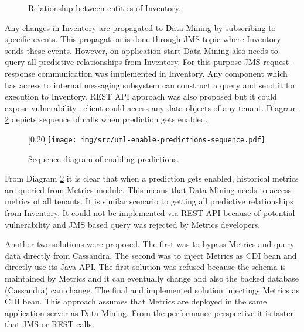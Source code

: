     \begin{figure}[H]
        \begin{center}
            \caption{Relationship between entities of Inventory.}
            \label{img:relationship}
        \end{center}
    \end{figure}

    Any changes in Inventory are propagated to Data Mining by subscribing to specific events. This propagation is done
    through JMS topic where Inventory sends these events. However, on application start Data Mining also needs to query
    all predictive relationships from Inventory. For this purpose JMS request-response communication was implemented in
    Inventory. Any component which has access to internal messaging subsystem can construct a query and send it for
    execution to Inventory. REST API approach was also proposed but it could expose vulnerability\,--\,client
    could access any data objects of any tenant. Diagram \ref{img:sequence-enab-pred} depicts sequence of calls
    when prediction gets enabled.

    \begin{figure}[H]
        \begin{center}
            \scalebox{0.30}[0.20]{\texttt{[image: img/src/uml-enable-predictions-sequence.pdf]}}
            \caption{Sequence diagram of enabling predictions.}
            \label{img:sequence-enab-pred}
        \end{center}
    \end{figure}

    From Diagram \ref{img:sequence-enab-pred} it is clear that when a prediction gets enabled, historical metrics
    are queried from Metrics module. This means that Data Mining needs to access metrics of all tenants. It is
    similar scenario to getting all predictive relationships from Inventory. It could not be implemented via REST API
    because of potential vulnerability and JMS based query was rejected by Metrics developers.

    Another two solutions were proposed. The first was to bypass Metrics and query data directly from Cassandra.
    The second was to inject Metrics as CDI bean and directly use its Java API. The first solution was refused because
    the schema is maintained by Metrics and it can eventually change and also the backed database (Cassandra) can
    change. The final and implemented solution injectings Metrics as CDI bean. This approach assumes that Metrics
    are deployed in the same application server as Data Mining. From the performance perspective it is faster that
    JMS or REST calls.

